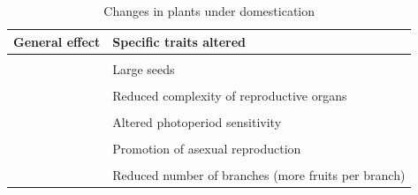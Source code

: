 \documentclass[
  ignorenonframetext,
  aspectratio=169]{beamer}
\begin{document}
\begin{frame}{}
\protect\hypertarget{section-6}{}
\begin{table}

\caption{\label{tab:domestication-syndrome}Changes in plants under domestication}
\centering
\fontsize{6}{8}\selectfont
\begin{tabular}[t]{>{\raggedright\arraybackslash}p{16em}>{\raggedright\arraybackslash}p{40em}}
\toprule
General effect & Specific traits altered\\
\midrule
\textbf{\cellcolor{gray!6}{Increased seedling vigor (more plants germinating)}} & \cellcolor{gray!6}{Loss of seed or tuber dormancy}\\
\textbf{} & Large seeds\\
\textbf{\cellcolor{gray!6}{Modified reproductive system}} & \cellcolor{gray!6}{Increased selfing}\\
\textbf{} & Reduced complexity of reproductive organs\\
\textbf{\cellcolor{gray!6}{}} & \cellcolor{gray!6}{Vegetatively reproducing plants}\\
\addlinespace
\textbf{} & Altered photoperiod sensitivity\\
\textbf{\cellcolor{gray!6}{}} & \cellcolor{gray!6}{Shift in sex form of species}\\
\textbf{} & Promotion of asexual reproduction\\
\textbf{\cellcolor{gray!6}{Increased number of seeds harvested}} & \cellcolor{gray!6}{Non-shattering}\\
\textbf{} & Reduced number of branches (more fruits per branch)\\
\bottomrule
\end{tabular}
\end{table}
\end{frame}
\end{document}
